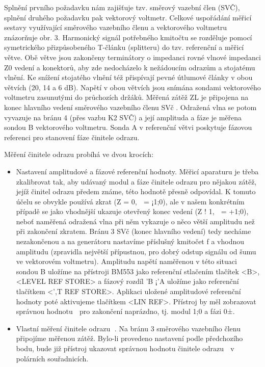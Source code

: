         Splnění prvního požadavku nám zajišťuje tzv. směrový vazební člen (SVČ), splnění druhého požadavku 
        pak vektorový voltmetr. Celkové uspořádání měřicí sestavy využívající směrového vazebního členu a 
        vektorového voltmetru znázorňuje obr. 3. Harmonický signál potřebného kmitočtu se rozděluje pomocí 
        symetrického přizpůsobeného T-článku (splitteru) do tzv. referenční a měřicí větve. Obě větve jsou 
        zakončeny terminátory o impedanci rovné vlnové impedanci Z0 vedení a konektorů, aby zde nedocházelo k 
        nežádoucím odrazům a stojatému vlnění. Ke snížení stojatého vlnění též přispívají pevné útlumové 
        články v obou větvích (20, 14 a 6 dB). Napětí v obou větvích jsou snímána sondami vektorového 
        voltmetru zasunutými do průchozích držáků. Měřená zátěž ZL je připojena na konec hlavního vedení 
        směrového vazebního členu SVč . Odražená vlna se potom vyvazuje na bránu 4 (přes vazbu K2 SVČ) a její 
        amplituda a fáze je měřena sondou B vektorového voltmetru. Sonda A v referenční větvi poskytuje 
        fázovou referenci pro stanovení fáze činitele odrazu.
  
        Měření činitele odrazu probíhá ve dvou krocích:
        \begin{itemize}
          \item Nastavení amplitudové a fázové referenční hodnoty. Měřicí aparaturu je třeba zkalibrovat tak, 
          aby udávaný modul a fáze činitele odrazu pro nějakou zátěž, jejíž činitel odrazu předem známe, této 
          hodnotě přesně odpovídal. K tomuto účelu se obvykle používá zkrat (Z = 0, 􀀀 = ¡1;0), ale v našem 
          konkrétním případě se jako vhodnější ukazuje otevřený konec vedení (Z ! 1, 􀀀 = +1;0), neboť 
          naměřená odražená vlna při něm vykazuje o něco větší amplitudu než při zakončení zkratem. Bránu 3 
          SVč (konec hlavního vedení) tedy necháme nezakončenou a na generátoru nastavíme příslušný kmitočet 
          f a vhodnou amplitudu (zpravidla největší přípustnou, pro dobrý odstup signálu od šumu ve 
          vektorovém voltmetru). Amplitudu napětí naměřenou v této situaci sondou B uložíme na přístroji 
          BM553 jako referenční stlačením tlačítek <B>, <LEVEL REF STORE> a fázový rozdíl 'B ¡'A uložíme jako 
          referenční tlačítkem <',T REF STORE>. Aplikaci uložené amplitudové referenční hodnoty poté 
          aktivujeme tlačítkem <LIN REF>. Přístroj by měl zobrazovat správnou hodnotu 􀀀 pro zakončení 
          naprázdno, tj. modul 1;0 a fázi 0±.
  
          \item Vlastní měření činitele odrazu 􀀀. Na bránu 3 směrového vazebního členu připojíme měřenou 
          zátěž. Bylo-li provedeno nastavení podle předchozího bodu, bude již přístroj ukazovat správnou 
          hodnotu činitele odrazu 􀀀 v polárních souřadnicích.   
        \end{itemize}
        

